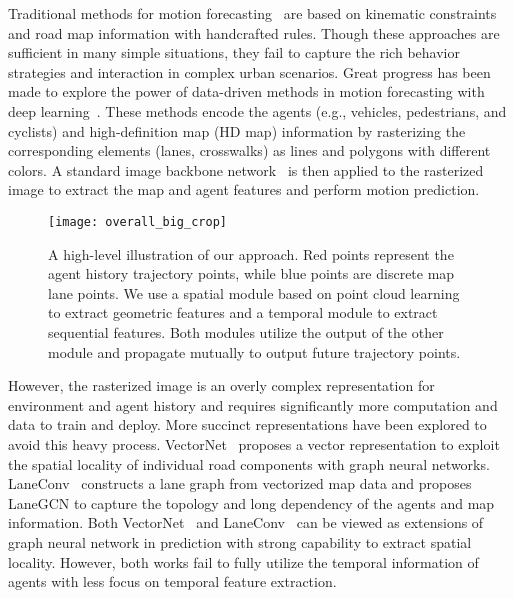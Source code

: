 \documentclass[final]{cvpr}
\begin{document}
Traditional methods for motion forecasting~\cite{houenou2013vehicle, schulz2018interaction,xie2017vehicle,ziegler2014making} are based on kinematic constraints and road map information with handcrafted rules. Though these approaches are sufficient in many simple situations, they fail to capture the rich behavior strategies and interaction in complex urban scenarios.
Great progress has been made to explore the power of data-driven methods in motion forecasting with deep learning~\cite{bansal2018chauffeurnet, chai2019multipath,cui2019multimodal, djuric2018short, phan2020covernet}. These methods encode the agents (e.g., vehicles, pedestrians, and cyclists) and high-definition map (HD map) 
information by rasterizing the corresponding elements (lanes, crosswalks) as lines and polygons with different colors. A standard image backbone network~\cite{he2016deep, simonyan2014very} is then applied to the rasterized image to extract the map and agent features and perform motion prediction. 


\begin{figure}
   \centering
   \texttt{[image: overall\_big\_crop]}
   \caption{A high-level illustration of our approach. Red points represent the agent history trajectory points, while blue points are discrete map lane points. We use a spatial module based on point cloud learning to extract geometric features and a temporal module to extract sequential features. Both modules utilize the output of the other module and propagate mutually to output future trajectory points.}
   \label{fig:overall_pipe}
\end{figure}
However, the rasterized image is an overly complex representation for environment and agent history and requires significantly more computation and data to train and deploy.
More succinct representations have been explored to avoid this heavy process.
VectorNet~\cite{gao2020vectornet} 
proposes a vector representation to exploit the spatial locality of individual road components with graph neural networks. LaneConv~\cite{liang2020learning} constructs a lane graph from vectorized map data and proposes LaneGCN to capture the topology and long dependency of the agents and map information. 
Both VectorNet~\cite{gao2020vectornet} and LaneConv~\cite{liang2020learning} can be viewed as extensions of graph 
neural network in prediction with strong capability to extract spatial locality. 
However, both works fail to fully utilize the temporal information of agents with less focus on temporal feature extraction. 
\end{document}
